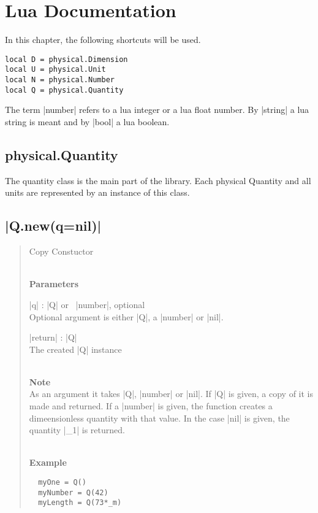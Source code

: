 \documentclass{ltxdoc}
\begin{document}
\newcommand{\method}[2]{\subsection*{|#1.#2|}}

\newcommand{\subtitle}[1]{\noindent \\\textbf{#1}}

\lstset{language=Lua}




\newpage
\section{Lua Documentation}

In this chapter, the following shortcuts will be used.
\begin{lstlisting}
local D = physical.Dimension
local U = physical.Unit
local N = physical.Number
local Q = physical.Quantity
\end{lstlisting}

The term |number| refers to a lua integer or a lua float number. By |string| a lua string is meant and by |bool| a lua boolean.






\subsection{physical.Quantity}
The quantity class is the main part of the library. Each physical Quantity and all units are represented by an instance of this class.


\method{Q}{new(q=nil)}
\begin{quote}
  Copy Constuctor

  \subtitle{Parameters}
  \begin{description}
    \item |q| : |Q| or \ |number|, optional\\
      Optional argument is either |Q|, a |number| or |nil|.

    \item |return| : |Q|\\
      The created |Q| instance
  \end{description}

  \subtitle{Note}\\
  As an argument it takes |Q|, |number| or |nil|. If |Q| is given, a copy of it is made and returned. If a |number| is given, the function creates a dimeensionless quantity with that value. In the case |nil| is given, the quantity |_1| is returned.

  \subtitle{Example}
  \begin{lstlisting}
  myOne = Q()
  myNumber = Q(42)
  myLength = Q(73*_m)
  \end{lstlisting}
\end{quote}
\end{document}
